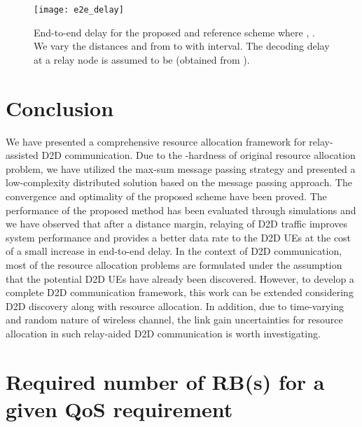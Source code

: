 \documentclass[twocolumn,10pt]{IEEEtran}
\begin{document}
\begin{figure}[h t b]
\centering
\texttt{[image: e2e\_delay]}
\caption{End-to-end delay for the proposed and reference scheme where ,  . We vary the distances  and  from  to  with  interval. The decoding delay at a relay node is assumed to be  (obtained from \cite{delay_imt}).}
\label{fig:delay}
\end{figure} 


\section{Conclusion} \label{sec:conclusion}

We have presented a comprehensive resource allocation
framework for relay-assisted D2D communication. Due to the -hardness of original resource allocation problem, we have utilized the max-sum message passing strategy and presented a low-complexity distributed solution based on the message passing approach.  The convergence and optimality of the proposed scheme have been proved. The performance of the proposed method has been evaluated through simulations and we have observed that after a distance margin, relaying of D2D traffic improves system performance and provides a better data rate to the D2D UEs at the cost of a small increase in end-to-end delay.
In the context of D2D communication, most of the resource allocation problems are formulated under the assumption that the potential D2D UEs have already been discovered. However, to develop a complete D2D communication framework, this work can be extended considering D2D discovery along with resource allocation. In addition, due to time-varying and random nature of wireless channel, the link gain uncertainties for resource allocation in such relay-aided D2D communication is worth investigating.










\appendices
{} 

\section{Required number of RB(s) for a given QoS requirement} 
\label{app:num_rb}
\end{document}
